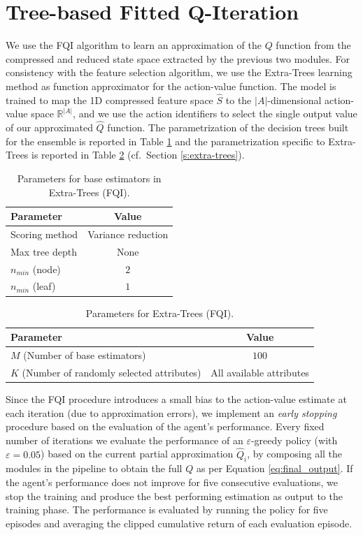 \section{Tree-based Fitted Q-Iteration}
We use the FQI algorithm to learn an approximation of the $Q$ function from the
compressed and reduced state space extracted by the previous two modules. 
For consistency with the feature selection algorithm, we use the Extra-Trees 
learning method as function approximator for the action-value function.
The model is trained to map the 1D compressed feature space $\hat{S}$ to the 
$|A|$-dimensional action-value space $\mathbb{R}^{|A|}$, and we use the action 
identifiers to select the single output value of our approximated $\hat{Q}$ 
function. 
The parametrization of the decision trees built for the ensemble is reported in
Table \ref{t:FQI_tree_params} and the parametrization specific to Extra-Trees 
is reported in Table \ref{t:FQI_extra_params} (cf.\ Section \ref{s:extra-trees}).
%
\begin{table}	
    \centering
    \begin{tabular}{l c} 
	\hline
	Parameter & Value \\ 
	\hline 
	Scoring method &  Variance reduction \\
	Max tree depth & None \\
	$n_{min}$ (node) & $2$\\
	$n_{min}$ (leaf) & $1$ \\
	\hline
    \end{tabular}
    \caption{Parameters for base estimators in Extra-Trees (FQI).}
    \label{t:FQI_tree_params}
\end{table}
%
%
\begin{table}
    \centering
    \begin{tabular}{l c} 
	\hline
	Parameter & Value \\ 
	\hline 
	$M$ (Number of base estimators) & $100$ \\
	$K$ (Number of randomly selected attributes) &  All available attributes \\
	\hline
    \end{tabular}
    \caption{Parameters for Extra-Trees (FQI).}
    \label{t:FQI_extra_params}
\end{table}
%

Since the FQI procedure introduces a small bias to the action-value estimate at 
each iteration (due to approximation errors), we implement an \textit{early 
stopping} procedure based on the evaluation of the agent's performance.
Every fixed number of iterations we evaluate the performance of an 
$\varepsilon$-greedy policy (with $\varepsilon = 0.05$) based on the current 
partial approximation $\hat{Q}_i$, by composing all the modules in the pipeline 
to obtain the full $Q$ as per Equation \eqref{eq:final_output}. 
If the agent's performance does not improve for five consecutive evaluations, we 
stop the training and produce the best performing estimation as output to the 
training phase.
The performance is evaluated by running the policy for five episodes and 
averaging the clipped cumulative return of each evaluation episode. 

